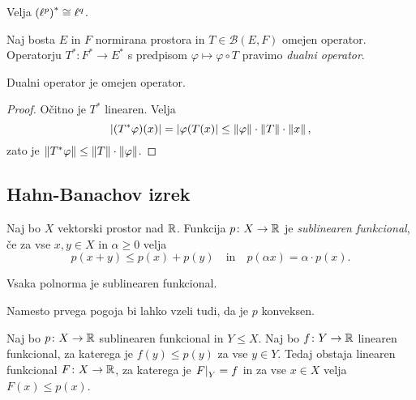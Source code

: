 \begin{posledica}
Velja $\left(\ell^p\right)^* \cong \ell^q$.
\end{posledica}


\begin{definicija}
Naj bosta $E$ in $F$ normirana prostora in $T \in \mathcal{B}(E,F)$
omejen operator. Operatorju $T^* \colon F^* \to E^*$ s predpisom
$\varphi \mapsto \varphi \circ T$ pravimo
\emph{dualni operator}.
\end{definicija}

\begin{lema}
Dualni operator je omejen operator.
\end{lema}

\begin{proof}
Očitno je $T^*$ linearen. Velja
\[
\left\lvert (T^* \varphi)(x)\right\rvert = \left\lvert \varphi(T(x)\right\rvert \leq
\left\lVert \varphi\right\rVert \cdot \left\lVert T\right\rVert \cdot \left\lVert x\right\rVert,
\]
zato je $\left\lVert T^* \varphi\right\rVert \leq \left\lVert T\right\rVert \cdot \left\lVert \varphi\right\rVert$.
\end{proof}

\newpage

\subsection{Hahn-Banachov izrek}

\begin{definicija}
Naj bo $X$ vektorski prostor nad $\mathbb{R}$. Funkcija $p \colon X \to \mathbb{R}$
je
\emph{sublinearen funkcional},
če za vse $x, y \in X$ in $\alpha \geq 0$ velja
\[
p(x+y) \leq p(x) + p(y)
\quad \text{in} \quad
p(\alpha x) = \alpha \cdot p(x).
\]
\end{definicija}

\begin{opomba}
Vsaka polnorma je sublinearen funkcional.
\end{opomba}

\begin{opomba}
Namesto prvega pogoja bi lahko vzeli tudi, da je $p$ konveksen.
\end{opomba}

\begin{izrek}
\label{iz:hb:1}
Naj bo $p \colon X \to \mathbb{R}$ sublinearen funkcional in $Y \leq X$.
Naj bo $f \colon Y \to \mathbb{R}$ linearen funkcional, za katerega je
$f(y) \leq p(y)$ za vse $y \in Y$. Tedaj obstaja linearen
funkcional $F \colon X \to \mathbb{R}$, za katerega je $\left. F\right|_{Y}^{} = f$
in za vse $x \in X$ velja $F(x) \leq p(x)$.
\end{izrek}

